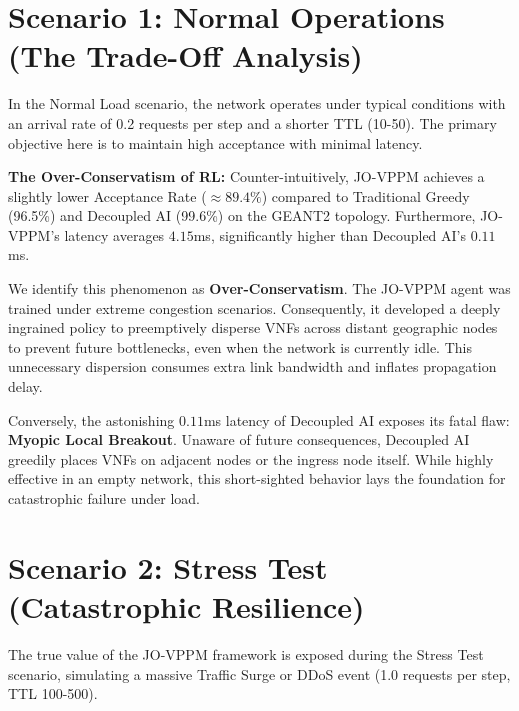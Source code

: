 \section{Scenario 1: Normal Operations (The Trade-Off Analysis)}
In the Normal Load scenario, the network operates under typical conditions with an arrival rate of 0.2 requests per step and a shorter TTL (10-50). The primary objective here is to maintain high acceptance with minimal latency.


\textbf{The Over-Conservatism of RL:} 
Counter-intuitively, JO-VPPM achieves a slightly lower Acceptance Rate ($\approx 89.4\%$) compared to Traditional Greedy (96.5\%) and Decoupled AI (99.6\%) on the GEANT2 topology. Furthermore, JO-VPPM's latency averages $4.15$ms, significantly higher than Decoupled AI's $0.11$ms.

We identify this phenomenon as \textbf{Over-Conservatism}. The JO-VPPM agent was trained under extreme congestion scenarios. Consequently, it developed a deeply ingrained policy to preemptively disperse VNFs across distant geographic nodes to prevent future bottlenecks, even when the network is currently idle. This unnecessary dispersion consumes extra link bandwidth and inflates propagation delay. 

Conversely, the astonishing $0.11$ms latency of Decoupled AI exposes its fatal flaw: \textbf{Myopic Local Breakout}. Unaware of future consequences, Decoupled AI greedily places VNFs on adjacent nodes or the ingress node itself. While highly effective in an empty network, this short-sighted behavior lays the foundation for catastrophic failure under load.

\section{Scenario 2: Stress Test (Catastrophic Resilience)}
The true value of the JO-VPPM framework is exposed during the Stress Test scenario, simulating a massive Traffic Surge or DDoS event (1.0 requests per step, TTL 100-500).


